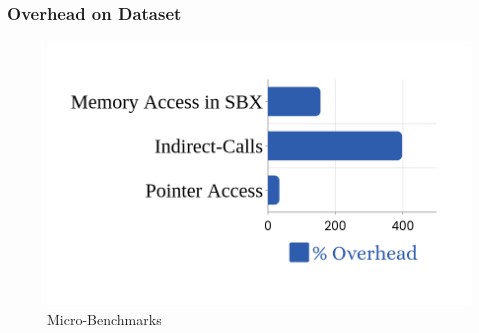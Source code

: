 \subsubsection{Overhead on Dataset}
\label{subsec:programoverhead}



\begin{figure}[h!]
\includegraphics[width=1.0\linewidth]{images/microbenchmark.png}
\caption{\systemname Micro-Benchmarks}
\label{fig:microbenchmarks}
\end{figure}





